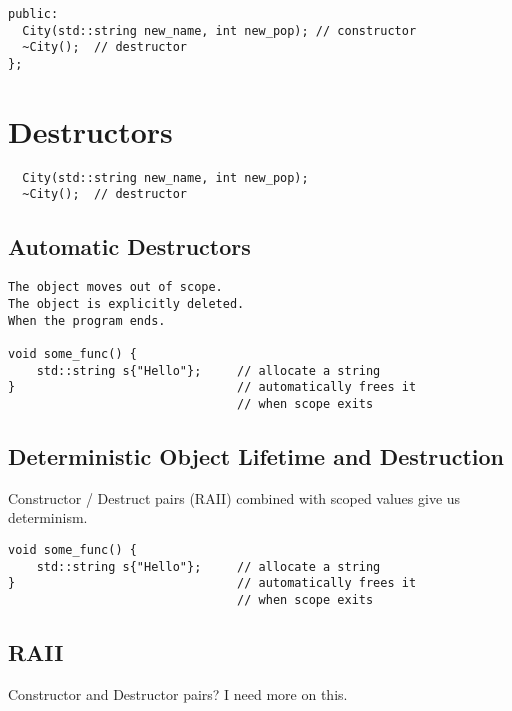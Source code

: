 \begin{verbatim}
public:
  City(std::string new_name, int new_pop); // constructor
  ~City();  // destructor
};
\end{verbatim}

\section{Destructors}

\begin{verbatim}
  City(std::string new_name, int new_pop);
  ~City();  // destructor
\end{verbatim}

\subsection{Automatic Destructors}

\begin{verbatim}
The object moves out of scope.
The object is explicitly deleted.
When the program ends.

void some_func() {
    std::string s{"Hello"};     // allocate a string
}                               // automatically frees it
                                // when scope exits
\end{verbatim}

\subsection{Deterministic Object Lifetime and Destruction}

Constructor / Destruct pairs (RAII) combined with scoped values give us determinism.

\begin{verbatim}
void some_func() {
    std::string s{"Hello"};     // allocate a string
}                               // automatically frees it
                                // when scope exits
\end{verbatim}


\subsection{RAII}

Constructor and Destructor pairs? I need more on this.

